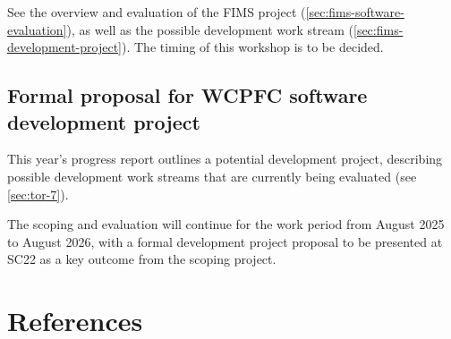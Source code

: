\documentclass{SCreport}
\begin{document}
See the overview and evaluation of the FIMS project
(\autoref{sec:fims-software-evaluation}), as well as the possible development
work stream (\autoref{sec:fims-development-project}). The timing of this
workshop is to be decided.

\vspace{2ex}

\subsection{Formal proposal for WCPFC software development project}
\label{sec:development-proposal-sc22}

This year's progress report outlines a potential development project, describing
possible development work streams that are currently being evaluated (see
\autoref{sec:tor-7}).

The scoping and evaluation will continue for the work period from August 2025 to
August 2026, with a formal development project proposal to be presented at SC22
as a key outcome from the scoping project.

\vspace{4ex}

\section{References}

\sloppy\setlength{}
\end{document}
